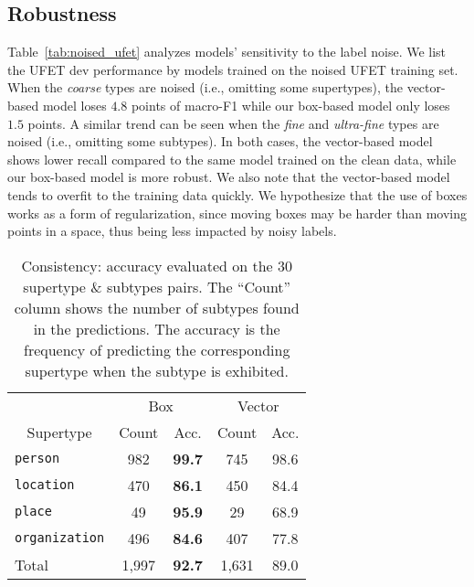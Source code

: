 \documentclass[11pt,a4paper]{article}
\begin{document}
\subsection{Robustness}
Table~\ref{tab:noised_ufet} analyzes models' sensitivity to the label noise. We list the UFET dev performance by models trained on the noised UFET training set. When the \emph{coarse} types are noised (i.e., omitting some supertypes), the vector-based model loses $4.8$ points of macro-F1 while our box-based model only loses $1.5$ points. A similar trend can be seen when the \emph{fine} and \emph{ultra-fine} types are noised (i.e., omitting some subtypes). In both cases, the vector-based model shows lower recall compared to the same model trained on the clean data, while our box-based model is more robust. We also note that the vector-based model tends to overfit to the training data quickly. We hypothesize that the use of boxes works as a form of regularization, since moving boxes may be harder than moving points in a space, thus being less impacted by noisy labels.


\renewcommand{\arraystretch}{1}
\begin{table}[t]
	\centering
	\small
	\setlength{\tabcolsep}{4pt}
	\begin{tabular}{l c c c c}
		\toprule
		\multicolumn{1}{c}{} & \multicolumn{2}{c}{Box} & \multicolumn{2}{c}{Vector}\\
		\cmidrule(r){2-3}  \cmidrule(r){4-5}
		\multicolumn{1}{c}{Supertype} & \multicolumn{1}{c}{Count} & \multicolumn{1}{c}{Acc.} & \multicolumn{1}{c}{Count} & \multicolumn{1}{c}{Acc.}\\
		\midrule
		 {\tt person} & 982 & \textbf{99.7} & 745 & 98.6\\
		 {\tt location} & 470 & \textbf{86.1} & 450 & 84.4\\
		 {\tt place} & 49 & \textbf{95.9} & 29 & 68.9 \\
		 {\tt organization} & 496 & \textbf{84.6} & 407 & 77.8 \\
		 \midrule
		 Total & 1,997 & \textbf{92.7} & 1,631 & 89.0\\
		\bottomrule 
	\end{tabular}
	\caption{Consistency: accuracy evaluated on the 30 supertype \& subtypes pairs. The ``Count'' column shows the number of subtypes found in the predictions. The accuracy is the frequency of predicting the corresponding supertype when the subtype is exhibited.}
	\label{tab:consistency}
	\vspace{-0pt}
\end{table}
\end{document}
